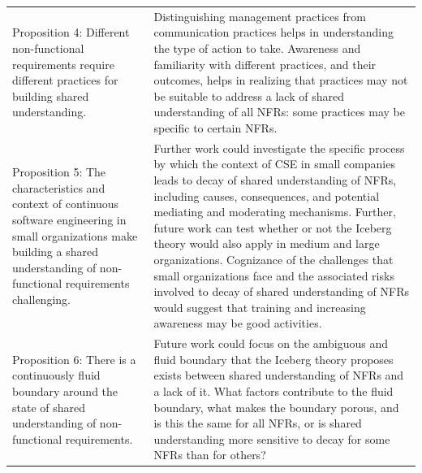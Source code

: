\documentclass[smallextended]{svjour3}        %
\begin{document}
\begin{table}[!h]
\begin{tabular}{p{4cm}p{7.7cm}}
Proposition 4: Different non-functional requirements require different practices for building shared understanding.
&
Distinguishing management practices from communication practices helps in understanding the type of action to take. 
Awareness and familiarity with different practices, and their outcomes, helps in realizing that practices may not be suitable to address a lack of shared understanding of all NFRs: some practices may be specific to certain NFRs.\\

\addlinespace 

Proposition 5: The characteristics and context of continuous software engineering in small organizations make building a shared understanding of non-functional requirements challenging. 
& 
Further work could investigate the specific process by which the context of CSE in small companies leads to decay of shared understanding of NFRs, including causes, consequences, and potential mediating and moderating mechanisms. Further, future work can test whether or not the Iceberg theory would also apply in medium and large organizations. Cognizance of the challenges that small organizations face and the associated risks involved to decay of shared understanding of NFRs would suggest that training and increasing awareness may be good activities.
\\

\addlinespace 

Proposition 6: There is a continuously fluid boundary around the state of
shared understanding of non-functional requirements.
& 
Future work could focus on the ambiguous and fluid boundary that the Iceberg theory proposes exists between shared understanding of NFRs and a lack of it. What factors contribute to the fluid boundary, what makes the boundary porous, and is this the same for all NFRs, or is shared understanding more sensitive to decay for some NFRs than for others? \\

\bottomrule 

\end{tabular}

\end{table}
\end{document}

